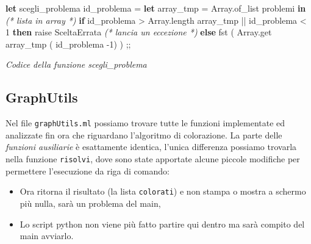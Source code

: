 \documentclass[11pt]{article}
\providecommand{\tightlist}{%
      \setlength{\itemsep}{0pt}\setlength{\parskip}{0pt}}
\newenvironment{Shaded}{}{}
\newcommand{\KeywordTok}[1]{\textcolor[rgb]{0.00,0.44,0.13}{\textbf{{#1}}}}
\newcommand{\DataTypeTok}[1]{\textcolor[rgb]{0.56,0.13,0.00}{{#1}}}
\newcommand{\DecValTok}[1]{\textcolor[rgb]{0.25,0.63,0.44}{{#1}}}
\newcommand{\CommentTok}[1]{\textcolor[rgb]{0.38,0.63,0.69}{\textit{{#1}}}}
\newcommand{\NormalTok}[1]{{#1}}
\begin{document}
    \begin{Shaded}
\begin{Highlighting}[]
\KeywordTok{let}\NormalTok{ scegli\_problema id\_problema =}
    \KeywordTok{let}\NormalTok{ array\_tmp = }\DataTypeTok{Array}\NormalTok{.of\_list problemi }\KeywordTok{in} \CommentTok{(* lista in array *)}
        \KeywordTok{if}\NormalTok{ id\_problema \textgreater{} }\DataTypeTok{Array}\NormalTok{.length array\_tmp || id\_problema \textless{} }\DecValTok{1}
          \KeywordTok{then}
            \DataTypeTok{raise}\NormalTok{ SceltaErrata }\CommentTok{(* lancia un \textquotesingle{} eccezione *)}
        \KeywordTok{else}
            \DataTypeTok{fst}\NormalTok{ ( }\DataTypeTok{Array}\NormalTok{.get array\_tmp ( id\_problema }\DecValTok{{-}1}\NormalTok{) ) }
\NormalTok{;;}
\end{Highlighting}
\end{Shaded}

\emph{Codice della funzione scegli\_problema}

    \hypertarget{graphutils}{%
\subsection{\texorpdfstring{GraphUtils
}{GraphUtils }}\label{graphutils}}

    Nel file \texttt{graphUtils.ml} possiamo trovare tutte le funzioni
implementate ed analizzate fin ora che riguardano l'algoritmo di
colorazione. La parte delle \emph{funzioni ausiliarie} è esattamente
identica, l'unica differenza possiamo trovarla nella funzione
\texttt{risolvi}, dove sono state apportate alcune piccole modifiche per
permettere l'esecuzione da riga di comando:

\begin{itemize}
\tightlist
\item
  Ora ritorna il risultato (la lista \texttt{colorati}) e non stampa o
  mostra a schermo più nulla, sarà un problema del main,
\item
  Lo script python non viene più fatto partire qui dentro ma sarà
  compito del main avviarlo.
\end{itemize}

\newpage
\end{document}
